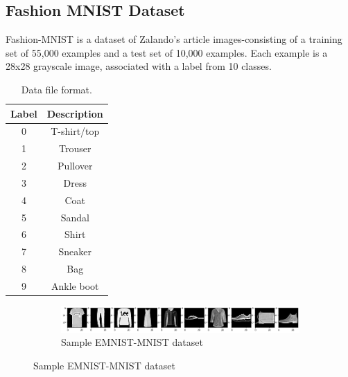     
\subsection{Fashion MNIST Dataset}
Fashion-MNIST is a dataset of Zalando's article images-consisting of a training set of 55,000 examples and a test set of 10,000 examples. Each example is a 28x28 grayscale image, associated with a label from 10 classes. 

\begin{table}[ht]
\centering
\begin{tabular}{|c|c|}
\hline
\textbf{Label} & \textbf{Description} \\ \hline
0  &   T-shirt/top \\ \hline
1  &   Trouser \\ \hline
2   &	Pullover \\ \hline
3   &	Dress \\ \hline
4   &	Coat \\ \hline
5   &	Sandal \\ \hline
6   &	Shirt \\ \hline
7   &	Sneaker \\ \hline
8   &	Bag \\ \hline
9   &	Ankle boot \\ \hline
\end{tabular}
\caption{Data file format.}
\label{tbl:training-file-format}
\end{table}

\begin{figure}[htb!]
        \centering
        \begin{subfigure}[b]{\textwidth}
            \centering
            \includegraphics[width=\linewidth]{images/fashion.png}
            \caption{Sample EMNIST-MNIST dataset}
            \label{fig:EMNIST MNIST dataset}
        \end{subfigure}%
        \label{fig:Rotate-misclassifications}
    \end{figure}
    \FloatBarrier
    
